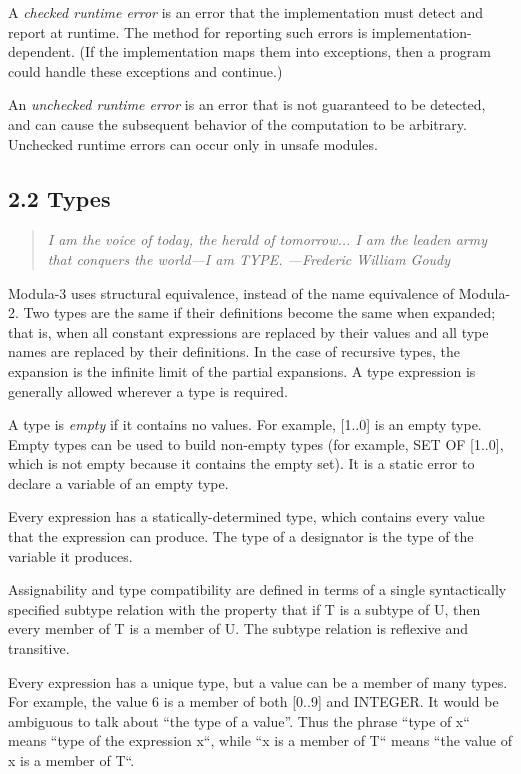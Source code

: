 \documentclass[10pt]{article}
\begin{document}
 A \emph{checked runtime error}
 is an error that the implementation must detect and report at runtime. The method for reporting such errors is implementation-dependent. (If the implementation maps them into exceptions, then a program could handle these exceptions and continue.) 


 An \emph{unchecked runtime error}
 is an error that is not guaranteed to be detected, and can cause the subsequent behavior of the computation to be arbitrary. Unchecked runtime errors can occur only in unsafe modules. 


 
\subsection*{2.2 Types}


 
\begin{quote}
\emph{ I am the voice of today, the herald of tomorrow... I am the leaden army that conquers the world---I am TYPE. ---Frederic William Goudy }
\end{quote}



 Modula-3 uses structural equivalence, instead of the name equivalence of Modula-2. Two types are the same if their definitions become the same when expanded; that is, when all constant expressions are replaced by their values and all type names are replaced by their definitions. In the case of recursive types, the expansion is the infinite limit of the partial expansions. A type expression is generally allowed wherever a type is required. 


 A type is \emph{empty}
 if it contains no values. For example, [1..0] is an empty type. Empty types can be used to build non-empty types (for example, SET OF [1..0], which is not empty because it contains the empty set). It is a static error to declare a variable of an empty type. 


  Every expression has a statically-determined type, which contains every value that the expression can produce. The type of a designator is the type of the variable it produces. 


  Assignability and type compatibility are defined in terms of a single syntactically specified subtype relation with the property that if T is a subtype of U, then every member of T is a member of U. The subtype relation is reflexive and transitive. 


  Every expression has a unique type, but a value can be a member of many types. For example, the value 6 is a member of both [0..9] and INTEGER. It would be ambiguous to talk about ``the type of a value''. Thus the phrase ``type of x`` means ``type of the expression x``, while ``x is a member of T`` means ``the value of x is a member of T``. 
\end{document}
